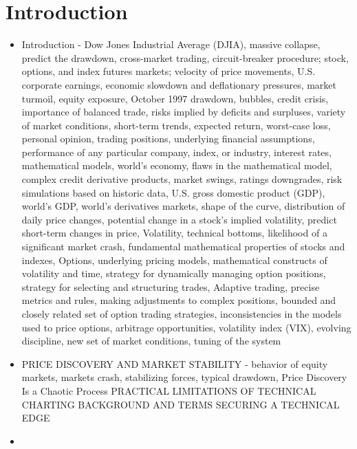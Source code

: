 \chapter{ Introduction }



    \begin{itemize}
        \item Introduction - Dow Jones Industrial Average (DJIA), massive collapse, predict the drawdown, cross-market trading, circuit-breaker procedure; stock, options, and index futures markets; velocity of price movements, U.S. corporate earnings, economic slowdown and deflationary pressures, market turmoil, equity exposure, October 1997 drawdown, bubbles, credit crisis,  importance of balanced trade, risks implied by deficits and surpluses, variety of market conditions, short-term trends, expected return, worst-case loss, personal opinion, trading positions, underlying financial assumptions, performance of any particular company, index, or industry, interest rates,  mathematical models, world's economy, flaws in the mathematical model, complex credit derivative products, market swings, ratings downgrades, risk simulations based on historic data, U.S. gross domestic product (GDP), world's GDP, world's derivatives markets, shape of the curve, distribution of daily price changes, potential change in a stock's implied volatility,  predict short-term changes in price, Volatility, technical bottoms, likelihood of a significant market crash, fundamental mathematical properties of stocks and indexes, Options, underlying pricing models, mathematical constructs of volatility and time, strategy for dynamically managing option positions, strategy for selecting and structuring trades, Adaptive trading, precise metrics and rules, making adjustments to complex positions, bounded and closely related set of option trading strategies, inconsistencies in the models used to price options,  arbitrage opportunities, volatility index (VIX), evolving discipline, new set of market conditions, tuning of the system
        \item PRICE DISCOVERY AND MARKET STABILITY - behavior of equity markets, markets crash, stabilizing forces, typical drawdown,
        Price Discovery Is a Chaotic Process
        PRACTICAL LIMITATIONS OF TECHNICAL CHARTING
        BACKGROUND AND TERMS
        SECURING A TECHNICAL EDGE
        \item
    \end{itemize}


